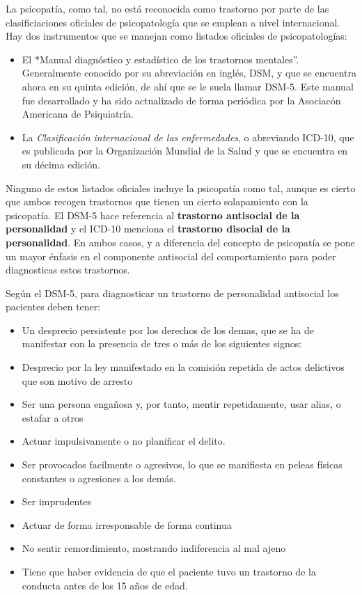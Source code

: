 \documentclass[
  spanish,
  letterpaper,
  DIV=11,
  numbers=noendperiod]{scrreprt}
\begin{document}
La psicopatía, como tal, no está reconocida como trastorno por parte de
las clasificiaciones oficiales de psicopatología que se emplean a nivel
internacional. Hay dos instrumentos que se manejan como listados
oficiales de psicopatologías:

\begin{itemize}
\item
  El *Manual diagnóstico y estadístico de los trastornos mentales''.
  Generalmente conocido por su abreviación en inglés, DSM, y que se
  encuentra ahora en su quinta edición, de ahí que se le suela llamar
  DSM-5. Este manual fue desarrollado y ha sido actualizado de forma
  periódica por la Asociacón Americana de Psiquiatría.
\item
  La \emph{Clasificación internacional de las enfermedades}, o
  abreviando ICD-10, que es publicada por la Organización Mundial de la
  Salud y que se encuentra en su décima edición.
\end{itemize}

Ninguno de estos listados oficiales incluye la psicopatía como tal,
aunque es cierto que ambos recogen trastornos que tienen un cierto
solapamiento con la psicopatía. El DSM-5 hace referencia al
\textbf{trastorno antisocial de la personalidad} y el ICD-10 menciona el
\textbf{trastorno disocial de la personalidad}. En ambos casos, y a
diferencia del concepto de psicopatía se pone un mayor énfasis en el
componente antisocial del comportamiento para poder diagnosticas estos
trastornos.

Según el DSM-5, para diagnosticar un trastorno de personalidad
antisocial los pacientes deben tener:

\begin{itemize}
\item
  Un desprecio persistente por los derechos de los demas, que se ha de
  manifestar con la presencia de tres o más de los siguientes signos:
\item
  Desprecio por la ley manifestado en la comisión repetida de actos
  delictivos que son motivo de arresto
\item
  Ser una persona engañosa y, por tanto, mentir repetidamente, usar
  alias, o estafar a otros
\item
  Actuar impulsivamente o no planificar el delito.
\item
  Ser provocados facilmente o agresivos, lo que se manifiesta en peleas
  físicas constantes o agresiones a los demás.
\item
  Ser imprudentes
\item
  Actuar de forma irresponsable de forma continua
\item
  No sentir remordimiento, mostrando indiferencia al mal ajeno
\item
  Tiene que haber evidencia de que el paciente tuvo un trastorno de la
  conducta antes de los 15 años de edad.
\end{itemize}
\end{document}
